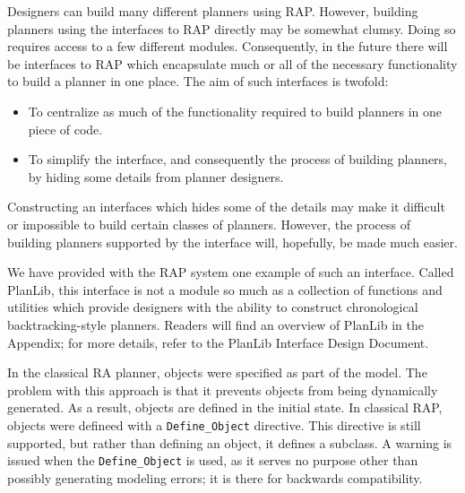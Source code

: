 Designers can build many different planners using RAP.  However,
building planners using the interfaces to RAP directly may be somewhat
clumsy.  Doing so requires access to a few different modules.
Consequently, in the future there will be interfaces to RAP which
encapsulate much or all of the necessary functionality to build a
planner in one place.  The aim of such interfaces is twofold:
\begin{itemize}
    \item To centralize as much of the functionality required to build planners in one
    piece of code.
    \item To simplify the interface, and consequently the process of building 
    planners, by hiding some details from planner designers.
\end{itemize}

Constructing an interfaces which hides some of the details may make it
difficult or impossible to build certain classes of planners. 
However, the process of building planners supported by the interface
will, hopefully, be made much easier.

We have provided with the RAP system one example of such an interface.  Called
PlanLib, this interface is not a module so much as a collection of functions and
utilities which provide designers with the ability to construct chronological
backtracking-style planners.  Readers will find an overview of PlanLib in the
Appendix; for more details, refer to the PlanLib Interface Design Document.








In the classical RA planner, objects were specified as part of the
model.  The problem with this approach is that it prevents objects
from being dynamically generated.  As a result, objects are defined in
the initial state.  In classical RAP, objects were defineed with a
{\tt Define\_Object} directive.  This directive is still supported, but
rather than defining an object, it defines a subclass.  A warning is
issued when the {\tt Define\_Object} is used, as it serves no purpose
other than possibly generating modeling errors; it is there for
backwards compatibility.



